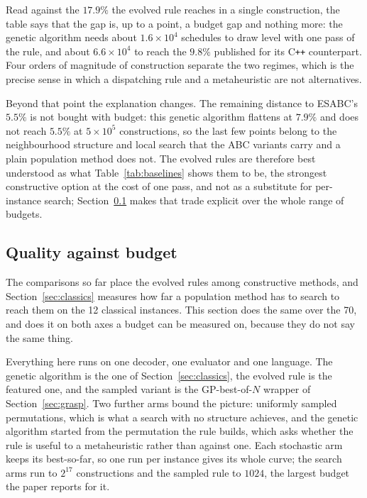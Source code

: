 \documentclass[review,authoryear,11pt]{elsarticle}
\newcommand{\rev}[1]{\textcolor{revcolor}{#1}}
\begin{document}
\rev{Read against the $17.9\%$ the evolved rule reaches in a single
construction, the table says that the gap is, up to a point, a budget
gap and nothing more: the genetic algorithm needs about
$1.6\times10^{4}$ schedules to draw level with one pass of the rule,
and about $6.6\times10^{4}$ to reach the $9.8\%$ published for its
C\texttt{++} counterpart. Four orders of magnitude of construction
separate the two regimes, which is the precise sense in which a
dispatching rule and a metaheuristic are not alternatives.}

\rev{Beyond that point the explanation changes. The remaining distance
to ESABC's $5.5\%$ is not bought with budget: this genetic algorithm
flattens at $7.9\%$ and does not reach $5.5\%$ at
$5\times10^{5}$ constructions, so the last few points belong to the
neighbourhood structure and local search that the ABC variants carry
and a plain population method does not. The evolved rules are therefore
best understood as what
Table~\ref{tab:baselines} shows them to be, the strongest constructive
option at the cost of one pass, and not as a substitute for per-instance
search; Section~\ref{sec:budget} makes that trade explicit over the
whole range of budgets.}


\subsection{Quality against budget}
\label{sec:budget}

\rev{The comparisons so far place the evolved rules among constructive
methods, and Section~\ref{sec:classics} measures how far a population
method has to search to reach them on the 12 classical instances. This
section does the same over the 70, and does it on both axes a budget can
be measured on, because they do not say the same thing.}

\rev{Everything here runs on one decoder, one evaluator and one
language. The genetic algorithm is the one of
Section~\ref{sec:classics}, the evolved rule is the featured one, and
the sampled variant is the GP-best-of-$N$ wrapper of
Section~\ref{sec:grasp}. Two further arms bound the picture: uniformly
sampled permutations, which is what a search with no structure
achieves, and the genetic algorithm started from the permutation the
rule builds, which asks whether the rule is useful to a metaheuristic
rather than against one. Each stochastic arm keeps its best-so-far, so
one run per instance gives its whole curve; the search arms run to
$2^{17}$ constructions and the sampled rule to $1024$, the largest
budget the paper reports for it.}
\end{document}
